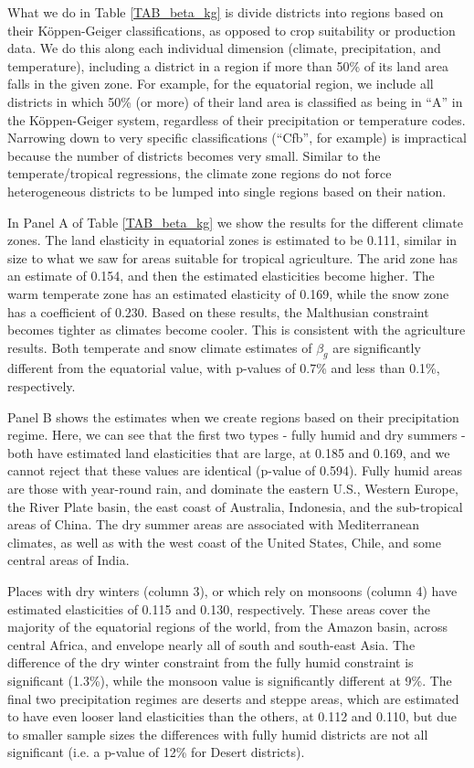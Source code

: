 What we do in Table \ref{TAB_beta_kg} is divide districts into regions based on their K{\"o}ppen-Geiger classifications, as opposed to crop suitability or production data. We do this along each individual dimension (climate, precipitation, and temperature), including a district in a region if more than 50\% of its land area falls in the given zone. For example, for the equatorial region, we include all districts in which 50\% (or more) of their land area is classified as being in ``A'' in the K{\"o}ppen-Geiger system, regardless of their precipitation or temperature codes. Narrowing down to very specific classifications (``Cfb'', for example) is impractical because the number of districts becomes very small. Similar to the temperate/tropical regressions, the climate zone regions do not force heterogeneous districts to be lumped into single regions based on their nation. 

In Panel A of Table \ref{TAB_beta_kg} we show the results for the different climate zones. The land elasticity in equatorial zones is estimated to be 0.111, similar in size to what we saw for areas suitable for tropical agriculture. The arid zone has an estimate of 0.154, and then the estimated elasticities become higher. The warm temperate zone has an estimated elasticity of 0.169, while the snow zone has a coefficient of 0.230. Based on these results, the Malthusian constraint becomes tighter as climates become cooler. This is consistent with the agriculture results. Both temperate and snow climate estimates of $\beta_g$ are significantly different from the equatorial value, with p-values of 0.7\% and less than 0.1\%, respectively.

Panel B shows the estimates when we create regions based on their precipitation regime. Here, we can see that the first two types - fully humid and dry summers - both have estimated land elasticities that are large, at 0.185 and 0.169, and we cannot reject that these values are identical (p-value of 0.594). Fully humid areas are those with year-round rain, and dominate the eastern U.S., Western Europe, the River Plate basin, the east coast of Australia, Indonesia, and the sub-tropical areas of China. The dry summer areas are associated with Mediterranean climates, as well as with the west coast of the United States, Chile, and some central areas of India.

Places with dry winters (column 3), or which rely on monsoons (column 4) have estimated elasticities of 0.115 and 0.130, respectively. These areas cover the majority of the equatorial regions of the world, from the Amazon basin, across central Africa, and envelope nearly all of south and south-east Asia. The difference of the dry winter constraint from the fully humid constraint is significant (1.3\%), while the monsoon value is significantly different at 9\%. The final two precipitation regimes are deserts and steppe areas, which are estimated to have even looser land elasticities than the others, at 0.112 and 0.110, but due to smaller sample sizes the differences with fully humid districts are not all significant (i.e. a p-value of 12\% for Desert districts).

